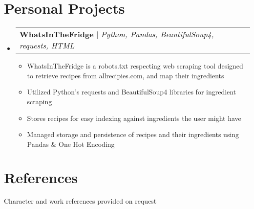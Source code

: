 \documentclass[letterpaper,11pt]{article}
\makeatletter
\newcommand{\resumeItem}[1]{
  \item\small{
    {#1 \vspace{-2pt}}
  }
}
\newcommand{\resumeProjectHeading}[2]{
    \item
    \begin{tabular*}{0.97\textwidth}{l@{\extracolsep{\fill}}r}
      \small#1 & #2 \\
    \end{tabular*}\vspace{-7pt}
}
\newcommand{\resumeSubHeadingListStart}{\begin{itemize}[leftmargin=0.15in, label={}]}
\newcommand{\resumeSubHeadingListEnd}{\end{itemize}}
\newcommand{\resumeItemListStart}{\begin{itemize}\vspace{0pt}}
\newcommand{\resumeItemListEnd}{\end{itemize}\vspace{0pt}}
\makeatother
\begin{document}
\section{Personal Projects}
    \resumeSubHeadingListStart
      \resumeProjectHeading
        {\textbf{WhatsInTheFridge{\vspace{5pt}}} $|$ \emph{Python, Pandas, BeautifulSoup4, requests, HTML}}{}
          \resumeItemListStart
          \resumeItem{WhatsInTheFridge is a robots.txt respecting web scraping tool designed to retrieve recipes from allrecipies.com, and map their ingredients}
            \resumeItem{Utilized Python's requests and BeautifulSoup4 libraries for ingredient scraping}
            \resumeItem{Stores recipes for easy indexing against ingredients the user might have}
            \resumeItem{Managed storage and persistence of recipes and their ingredients using Pandas \& One Hot Encoding}
          \resumeItemListEnd
    \resumeSubHeadingListEnd
\section{References}
Character and work references provided on request
\end{document}
